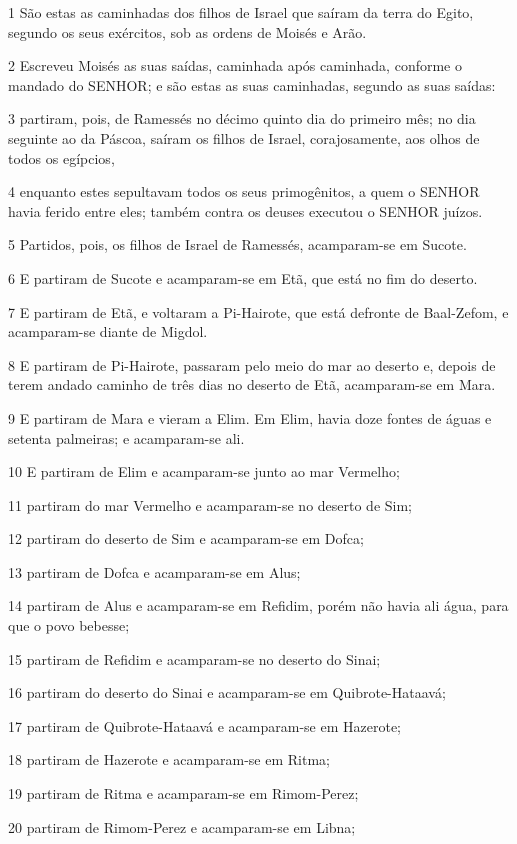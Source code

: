 \par 1 São estas as caminhadas dos filhos de Israel que saíram da terra do Egito, segundo os seus exércitos, sob as ordens de Moisés e Arão.
\par 2 Escreveu Moisés as suas saídas, caminhada após caminhada, conforme o mandado do SENHOR; e são estas as suas caminhadas, segundo as suas saídas:
\par 3 partiram, pois, de Ramessés no décimo quinto dia do primeiro mês; no dia seguinte ao da Páscoa, saíram os filhos de Israel, corajosamente, aos olhos de todos os egípcios,
\par 4 enquanto estes sepultavam todos os seus primogênitos, a quem o SENHOR havia ferido entre eles; também contra os deuses executou o SENHOR juízos.
\par 5 Partidos, pois, os filhos de Israel de Ramessés, acamparam-se em Sucote.
\par 6 E partiram de Sucote e acamparam-se em Etã, que está no fim do deserto.
\par 7 E partiram de Etã, e voltaram a Pi-Hairote, que está defronte de Baal-Zefom, e acamparam-se diante de Migdol.
\par 8 E partiram de Pi-Hairote, passaram pelo meio do mar ao deserto e, depois de terem andado caminho de três dias no deserto de Etã, acamparam-se em Mara.
\par 9 E partiram de Mara e vieram a Elim. Em Elim, havia doze fontes de águas e setenta palmeiras; e acamparam-se ali.
\par 10 E partiram de Elim e acamparam-se junto ao mar Vermelho;
\par 11 partiram do mar Vermelho e acamparam-se no deserto de Sim;
\par 12 partiram do deserto de Sim e acamparam-se em Dofca;
\par 13 partiram de Dofca e acamparam-se em Alus;
\par 14 partiram de Alus e acamparam-se em Refidim, porém não havia ali água, para que o povo bebesse;
\par 15 partiram de Refidim e acamparam-se no deserto do Sinai;
\par 16 partiram do deserto do Sinai e acamparam-se em Quibrote-Hataavá;
\par 17 partiram de Quibrote-Hataavá e acamparam-se em Hazerote;
\par 18 partiram de Hazerote e acamparam-se em Ritma;
\par 19 partiram de Ritma e acamparam-se em Rimom-Perez;
\par 20 partiram de Rimom-Perez e acamparam-se em Libna;
